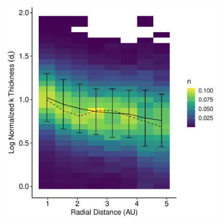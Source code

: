 \documentclass[
]{agujournal2019}
\begin{document}
\begin{figure}
%
\begin{minipage}{0.33\linewidth}
\includegraphics{figures/thickness/thickness_k_N1_r_dist.pdf}\end{minipage}%

\end{figure}%
\end{document}
